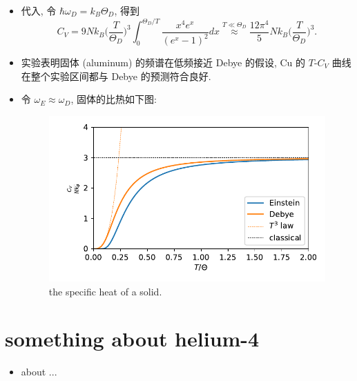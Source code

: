 \begin{itemize}
	\item 代入, 令 $\hbar \omega_D = k_B \Theta_D$, 得到
	\begin{equation}
		C_V = 9 N k_B \Big( \frac{T}{\Theta_D} \Big)^3 \int_0^{\Theta_D / T} \frac{x^4 e^x}{(e^x - 1)^2} dx \overset{T \ll \Theta_D}{\approx} \frac{12 \pi^4}{5} N k_B \Big( \frac{T}{\Theta_D} \Big)^3.
	\end{equation}
	
	\item 实验表明固体 (aluminum) 的频谱在低频接近 Debye 的假设, Cu 的 $T$-$C_V$ 曲线在整个实验区间都与 Debye 的预测符合良好.
	
	\item 令 $\omega_E \approx \omega_D$, 固体的比热如下图:
	
	\begin{figure}[H]
		\centering
		\includegraphics[scale=0.8]{figures/the specific heat of a solid.pdf}
		\caption{the specific heat of a solid.}
		\label{figure 7.4}
	\end{figure}
\end{itemize}

\section{something about helium-4}
\begin{itemize}
	\item about ...
\end{itemize}
